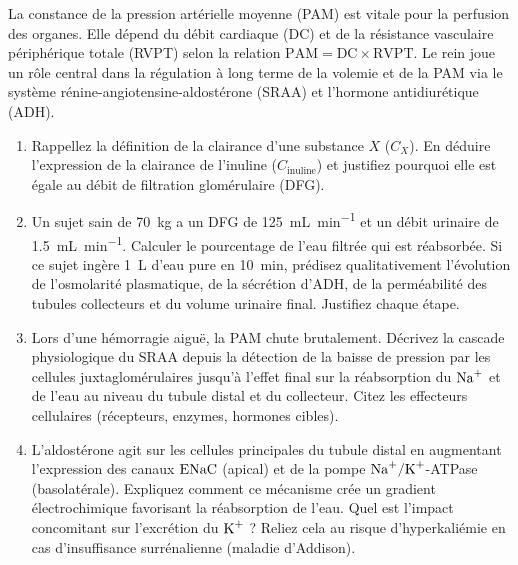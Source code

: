 \documentclass[11pt]{article}
\begin{document}
\begin{exercice}
La constance de la pression artérielle moyenne (PAM) est vitale pour la perfusion des organes. Elle dépend du débit cardiaque (DC) et de la résistance vasculaire périphérique totale (RVPT) selon la relation $\mathrm{PAM} = \mathrm{DC} \times \mathrm{RVPT}$. Le rein joue un rôle central dans la régulation à long terme de la volemie et de la PAM via le système rénine-angiotensine-aldostérone (SRAA) et l'hormone antidiurétique (ADH).

\begin{enumerate}
    \item Rappellez la définition de la clairance d'une substance $X$ ($C_X$). En déduire l'expression de la clairance de l'inuline ($C_{\text{inuline}}$) et justifiez pourquoi elle est égale au débit de filtration glomérulaire (DFG).
    \item Un sujet sain de \SI{70}{kg} a un DFG de \SI{125}{mL.min^{-1}} et un débit urinaire de \SI{1,5}{mL.min^{-1}}. Calculer le pourcentage de l'eau filtrée qui est réabsorbée. Si ce sujet ingère \SI{1}{L} d'eau pure en \SI{10}{min}, prédisez qualitativement l'évolution de l'osmolarité plasmatique, de la sécrétion d'ADH, de la perméabilité des tubules collecteurs et du volume urinaire final. Justifiez chaque étape.
    \item Lors d'une hémorragie aiguë, la PAM chute brutalement. Décrivez la cascade physiologique du SRAA depuis la détection de la baisse de pression par les cellules juxtaglomérulaires jusqu'à l'effet final sur la réabsorption du $\ce{Na+}$ et de l'eau au niveau du tubule distal et du collecteur. Citez les effecteurs cellulaires (récepteurs, enzymes, hormones cibles).
    \item L'aldostérone agit sur les cellules principales du tubule distal en augmentant l'expression des canaux $\ce{ENaC}$ (apical) et de la pompe $\ce{Na+/K+}$-ATPase (basolatérale). Expliquez comment ce mécanisme crée un gradient électrochimique favorisant la réabsorption de l'eau. Quel est l'impact concomitant sur l'excrétion du $\ce{K+}$ ? Reliez cela au risque d'hyperkaliémie en cas d'insuffisance surrénalienne (maladie d'Addison).
\end{enumerate}
\end{exercice}
\end{document}
